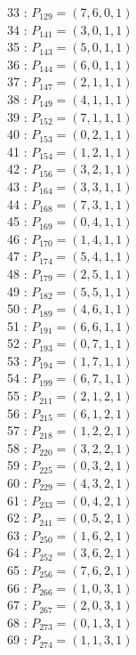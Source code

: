 \documentclass{article}
\begin{document}
{\begin{multicols}{3}
33 : $P_{129}=( 7, 6, 0, 1 )$\\
34 : $P_{141}=( 3, 0, 1, 1 )$\\
35 : $P_{143}=( 5, 0, 1, 1 )$\\
36 : $P_{144}=( 6, 0, 1, 1 )$\\
37 : $P_{147}=( 2, 1, 1, 1 )$\\
38 : $P_{149}=( 4, 1, 1, 1 )$\\
39 : $P_{152}=( 7, 1, 1, 1 )$\\
40 : $P_{153}=( 0, 2, 1, 1 )$\\
41 : $P_{154}=( 1, 2, 1, 1 )$\\
42 : $P_{156}=( 3, 2, 1, 1 )$\\
43 : $P_{164}=( 3, 3, 1, 1 )$\\
44 : $P_{168}=( 7, 3, 1, 1 )$\\
45 : $P_{169}=( 0, 4, 1, 1 )$\\
46 : $P_{170}=( 1, 4, 1, 1 )$\\
47 : $P_{174}=( 5, 4, 1, 1 )$\\
48 : $P_{179}=( 2, 5, 1, 1 )$\\
49 : $P_{182}=( 5, 5, 1, 1 )$\\
50 : $P_{189}=( 4, 6, 1, 1 )$\\
51 : $P_{191}=( 6, 6, 1, 1 )$\\
52 : $P_{193}=( 0, 7, 1, 1 )$\\
53 : $P_{194}=( 1, 7, 1, 1 )$\\
54 : $P_{199}=( 6, 7, 1, 1 )$\\
55 : $P_{211}=( 2, 1, 2, 1 )$\\
56 : $P_{215}=( 6, 1, 2, 1 )$\\
57 : $P_{218}=( 1, 2, 2, 1 )$\\
58 : $P_{220}=( 3, 2, 2, 1 )$\\
59 : $P_{225}=( 0, 3, 2, 1 )$\\
60 : $P_{229}=( 4, 3, 2, 1 )$\\
61 : $P_{233}=( 0, 4, 2, 1 )$\\
62 : $P_{241}=( 0, 5, 2, 1 )$\\
63 : $P_{250}=( 1, 6, 2, 1 )$\\
64 : $P_{252}=( 3, 6, 2, 1 )$\\
65 : $P_{256}=( 7, 6, 2, 1 )$\\
66 : $P_{266}=( 1, 0, 3, 1 )$\\
67 : $P_{267}=( 2, 0, 3, 1 )$\\
68 : $P_{273}=( 0, 1, 3, 1 )$\\
69 : $P_{274}=( 1, 1, 3, 1 )$\\

\end{multicols}}
\end{document}
